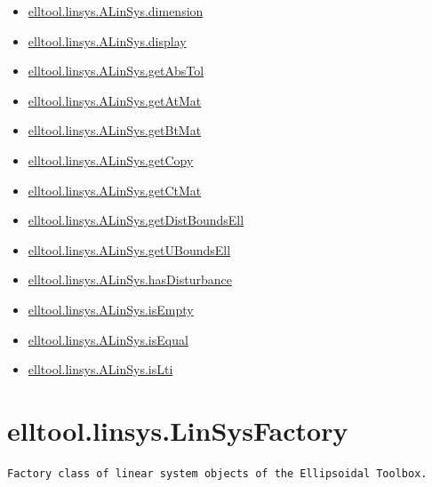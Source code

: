 \documentclass[letterpaper,10pt,english]{sphinxmanual}
\begin{document}
\begin{itemize}
\item {} 
{\hyperref[chap_func:elltool-linsys-alinsys-dimension]{elltool.linsys.ALinSys.dimension}}

\item {} 
{\hyperref[chap_func:elltool-linsys-alinsys-display]{elltool.linsys.ALinSys.display}}

\item {} 
{\hyperref[chap_func:elltool-linsys-alinsys-getabstol]{elltool.linsys.ALinSys.getAbsTol}}

\item {} 
{\hyperref[chap_func:elltool-linsys-alinsys-getatmat]{elltool.linsys.ALinSys.getAtMat}}

\item {} 
{\hyperref[chap_func:elltool-linsys-alinsys-getbtmat]{elltool.linsys.ALinSys.getBtMat}}

\item {} 
{\hyperref[chap_func:elltool-linsys-alinsys-getcopy]{elltool.linsys.ALinSys.getCopy}}

\item {} 
{\hyperref[chap_func:elltool-linsys-alinsys-getctmat]{elltool.linsys.ALinSys.getCtMat}}

\item {} 
{\hyperref[chap_func:elltool-linsys-alinsys-getdistboundsell]{elltool.linsys.ALinSys.getDistBoundsEll}}

\item {} 
{\hyperref[chap_func:elltool-linsys-alinsys-getuboundsell]{elltool.linsys.ALinSys.getUBoundsEll}}

\item {} 
{\hyperref[chap_func:elltool-linsys-alinsys-hasdisturbance]{elltool.linsys.ALinSys.hasDisturbance}}

\item {} 
{\hyperref[chap_func:elltool-linsys-alinsys-isempty]{elltool.linsys.ALinSys.isEmpty}}

\item {} 
{\hyperref[chap_func:elltool-linsys-alinsys-isequal]{elltool.linsys.ALinSys.isEqual}}

\item {} 
{\hyperref[chap_func:elltool-linsys-alinsys-islti]{elltool.linsys.ALinSys.isLti}}

\end{itemize}


\section{elltool.linsys.LinSysFactory}
\label{chap_func:elltool-linsys-linsysfactory}
\begin{Verbatim}[commandchars=\\\{\}]
Factory class of linear system objects of the Ellipsoidal Toolbox.
\end{Verbatim}
\end{document}
